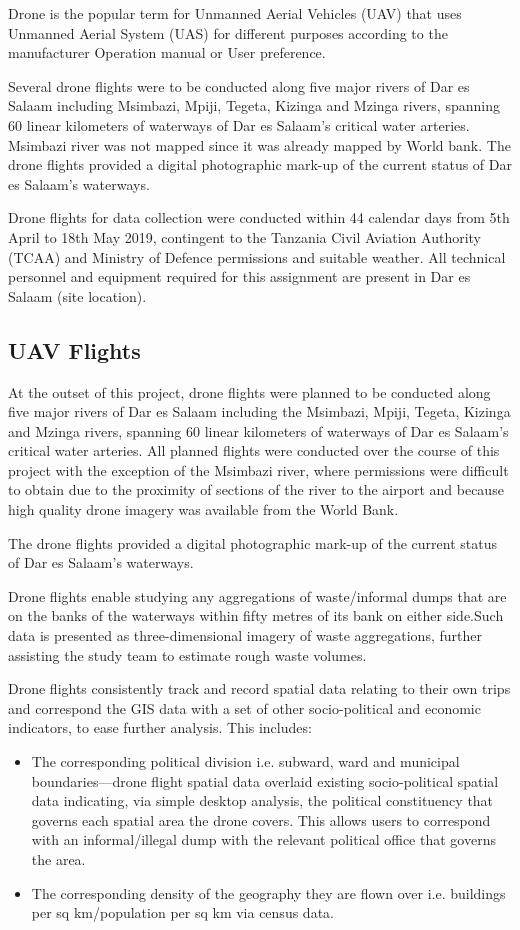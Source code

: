 \documentclass[a4paper,12pt,twoside]{article}
\begin{document}
Drone is the popular term for Unmanned Aerial Vehicles (UAV) that uses Unmanned Aerial System (UAS) for different purposes according to the manufacturer Operation manual or User preference. 

Several drone flights were to be  conducted along five major rivers of Dar es Salaam including  Msimbazi, Mpiji, Tegeta, Kizinga and Mzinga rivers, spanning 60 linear kilometers of waterways of Dar es Salaam’s critical water arteries. Msimbazi river was not mapped since it  was  already mapped by World bank. The drone flights provided a digital photographic mark-up of the current status of Dar es Salaam’s waterways. 

Drone flights for data collection were conducted within 44 calendar days from 5th April to 18th May 2019, contingent  to the Tanzania Civil Aviation Authority (TCAA) and Ministry of Defence permissions and suitable weather. All technical personnel and equipment required for this assignment are present in Dar es Salaam (site location). 

\subsection{UAV Flights}
At the outset of this project, drone flights were planned to be  conducted along five major rivers of Dar es Salaam including the  Msimbazi, Mpiji, Tegeta, Kizinga and Mzinga rivers, spanning 60 linear kilometers of waterways of Dar es Salaam’s critical water arteries. All planned flights were conducted over the course of this project with the exception of the Msimbazi river, where permissions were difficult to obtain due to the proximity of sections of the river to the airport and because high quality drone imagery was available from the World Bank. 

The drone flights provided a digital photographic mark-up of the current status of Dar es Salaam’s waterways. 

Drone flights enable studying any aggregations of waste/informal dumps that are on the banks of the waterways within fifty metres of its bank on either side.Such data is presented as three-dimensional imagery of waste aggregations, further assisting the study team to estimate rough waste volumes.  

Drone flights consistently track and record spatial data relating to their own trips and correspond the GIS data with a set of other socio-political and economic indicators, to ease further analysis. This includes:
\begin{itemize}
    \item The corresponding political division i.e. subward, ward and municipal boundaries—drone flight spatial data overlaid existing socio-political spatial data indicating, via simple desktop analysis, the political constituency that governs each spatial area the drone covers. This allows users to correspond with an informal/illegal dump with the relevant political office that governs the area.
    \item The corresponding density of the geography they are flown over i.e. buildings per sq km/population per sq km via census data.
\end{itemize}  
\end{document}
